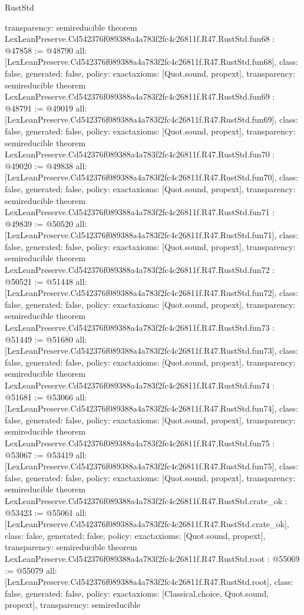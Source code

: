 \begin{lexlean}{RustStd}
\begin{coremodule}
{  transparency: semireducible
}
theorem LexLeanPreserve.Cd542376f089388a4a783f2fc4c26811f.R47.RustStd.fun68 : @47858 := @48790 {
  all: [LexLeanPreserve.Cd542376f089388a4a783f2fc4c26811f.R47.RustStd.fun68],
  class: false,
  generated: false,
  policy: exact{axioms: [Quot.sound, propext]},
  transparency: semireducible
}
theorem LexLeanPreserve.Cd542376f089388a4a783f2fc4c26811f.R47.RustStd.fun69 : @48791 := @49019 {
  all: [LexLeanPreserve.Cd542376f089388a4a783f2fc4c26811f.R47.RustStd.fun69],
  class: false,
  generated: false,
  policy: exact{axioms: [Quot.sound, propext]},
  transparency: semireducible
}
theorem LexLeanPreserve.Cd542376f089388a4a783f2fc4c26811f.R47.RustStd.fun70 : @49020 := @49838 {
  all: [LexLeanPreserve.Cd542376f089388a4a783f2fc4c26811f.R47.RustStd.fun70],
  class: false,
  generated: false,
  policy: exact{axioms: [Quot.sound, propext]},
  transparency: semireducible
}
theorem LexLeanPreserve.Cd542376f089388a4a783f2fc4c26811f.R47.RustStd.fun71 : @49839 := @50520 {
  all: [LexLeanPreserve.Cd542376f089388a4a783f2fc4c26811f.R47.RustStd.fun71],
  class: false,
  generated: false,
  policy: exact{axioms: [Quot.sound, propext]},
  transparency: semireducible
}
theorem LexLeanPreserve.Cd542376f089388a4a783f2fc4c26811f.R47.RustStd.fun72 : @50521 := @51448 {
  all: [LexLeanPreserve.Cd542376f089388a4a783f2fc4c26811f.R47.RustStd.fun72],
  class: false,
  generated: false,
  policy: exact{axioms: [Quot.sound, propext]},
  transparency: semireducible
}
theorem LexLeanPreserve.Cd542376f089388a4a783f2fc4c26811f.R47.RustStd.fun73 : @51449 := @51680 {
  all: [LexLeanPreserve.Cd542376f089388a4a783f2fc4c26811f.R47.RustStd.fun73],
  class: false,
  generated: false,
  policy: exact{axioms: [Quot.sound, propext]},
  transparency: semireducible
}
theorem LexLeanPreserve.Cd542376f089388a4a783f2fc4c26811f.R47.RustStd.fun74 : @51681 := @53066 {
  all: [LexLeanPreserve.Cd542376f089388a4a783f2fc4c26811f.R47.RustStd.fun74],
  class: false,
  generated: false,
  policy: exact{axioms: [Quot.sound, propext]},
  transparency: semireducible
}
theorem LexLeanPreserve.Cd542376f089388a4a783f2fc4c26811f.R47.RustStd.fun75 : @53067 := @53419 {
  all: [LexLeanPreserve.Cd542376f089388a4a783f2fc4c26811f.R47.RustStd.fun75],
  class: false,
  generated: false,
  policy: exact{axioms: [Quot.sound, propext]},
  transparency: semireducible
}
theorem LexLeanPreserve.Cd542376f089388a4a783f2fc4c26811f.R47.RustStd.crate_ok : @53423 := @55061 {
  all: [LexLeanPreserve.Cd542376f089388a4a783f2fc4c26811f.R47.RustStd.crate_ok],
  class: false,
  generated: false,
  policy: exact{axioms: [Quot.sound, propext]},
  transparency: semireducible
}
theorem LexLeanPreserve.Cd542376f089388a4a783f2fc4c26811f.R47.RustStd.root : @55069 := @55079 {
  all: [LexLeanPreserve.Cd542376f089388a4a783f2fc4c26811f.R47.RustStd.root],
  class: false,
  generated: false,
  policy: exact{axioms: [Classical.choice, Quot.sound, propext]},
  transparency: semireducible
}


\end{coremodule}
\end{lexlean}

